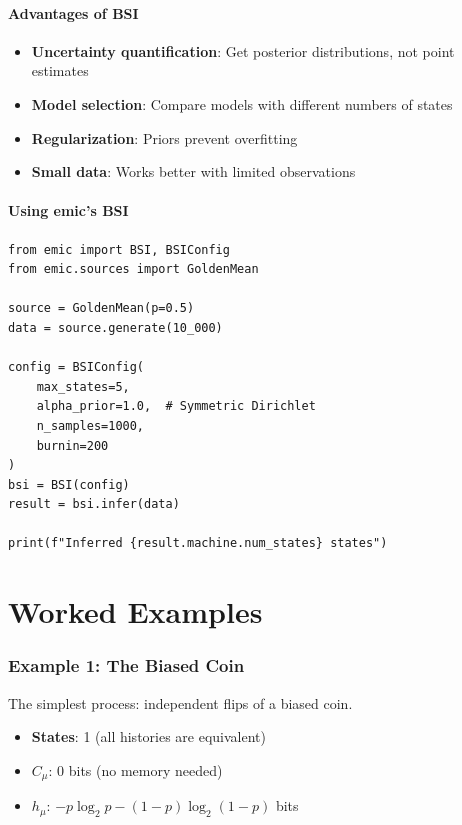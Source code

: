 \documentclass[11pt,a4paper]{article}
\theoremstyle{definition}
\theoremstyle{plain}
\newcommand{\Cmu}{C_\mu}
\newcommand{\hmu}{h_\mu}
\begin{document}
\subsection{Advantages of BSI}

\begin{itemize}
    \item \textbf{Uncertainty quantification}: Get posterior distributions, not point estimates
    \item \textbf{Model selection}: Compare models with different numbers of states
    \item \textbf{Regularization}: Priors prevent overfitting
    \item \textbf{Small data}: Works better with limited observations
\end{itemize}

\subsection{Using emic's BSI}

\begin{lstlisting}
from emic import BSI, BSIConfig
from emic.sources import GoldenMean

source = GoldenMean(p=0.5)
data = source.generate(10_000)

config = BSIConfig(
    max_states=5,
    alpha_prior=1.0,  # Symmetric Dirichlet
    n_samples=1000,
    burnin=200
)
bsi = BSI(config)
result = bsi.infer(data)

print(f"Inferred {result.machine.num_states} states")
\end{lstlisting}

\part{Worked Examples}

\section{Example 1: The Biased Coin}
\label{sec:example-coin}

The simplest process: independent flips of a biased coin.

\begin{itemize}
    \item \textbf{States}: 1 (all histories are equivalent)
    \item \textbf{$\Cmu$}: 0 bits (no memory needed)
    \item \textbf{$\hmu$}: $-p \log_2 p - (1-p) \log_2 (1-p)$ bits
\end{itemize}
\end{document}
